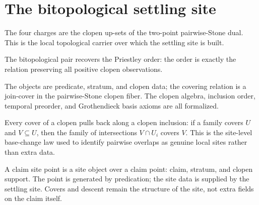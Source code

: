 \section{The bitopological settling site}

\begin{proposition}\label{thm:four-priestley-dual}\leanok{}
The four charges are the clopen up-sets of the two-point pairwise-Stone dual.
This is the local topological carrier over which the settling site is built.
\end{proposition}

\begin{theorem}\label{thm:pairwise-stone-order-recovery}\leanok{}
The bitopological pair recovers the Priestley order: the order is exactly the
relation preserving all positive clopen observations.
\end{theorem}

\begin{theorem}\label{thm:bitopological-site-grothendieck}\leanok{}
The objects are predicate, stratum, and clopen data; the covering relation is a
join-cover in the pairwise-Stone clopen fiber.  The clopen algebra, inclusion
order, temporal preorder, and Grothendieck basis axioms are all formalized.
\end{theorem}

\begin{theorem}\label{thm:covers-pullback}\leanok{}
Every cover of a clopen pulls back along a clopen inclusion: if a family covers
\(U\) and \(V \subseteq U\), then the family of intersections \(V \cap U_i\)
covers \(V\).  This is the site-level base-change law used to identify pairwise
overlaps as genuine local sites rather than extra data.
\end{theorem}

\begin{proposition}\label{thm:claim-site-point}\leanok{}
A claim site point is a site object over a claim point: claim, stratum, and
clopen support. The point is generated by predication; the site data is supplied
by the settling site. Covers and descent remain the structure of the site, not
extra fields on the claim itself.
\end{proposition}

